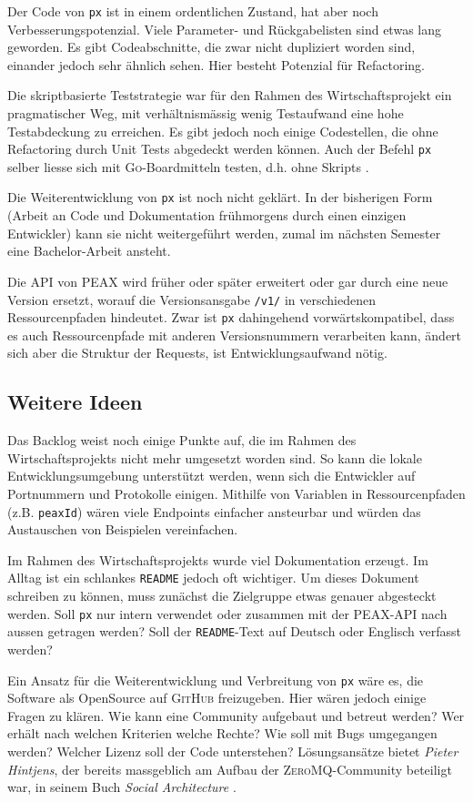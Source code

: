 Der Code von \texttt{px} ist in einem ordentlichen Zustand, hat aber noch Verbesserungspotenzial. Viele Parameter- und Rückgabelisten sind etwas lang geworden. Es gibt Codeabschnitte, die zwar nicht dupliziert worden sind, einander jedoch sehr ähnlich sehen. Hier besteht Potenzial für Refactoring.

Die skriptbasierte Teststrategie war für den Rahmen des Wirtschaftsprojekt ein pragmatischer Weg, mit verhältnismässig wenig Testaufwand eine hohe Testabdeckung zu erreichen. Es gibt jedoch noch einige Codestellen, die ohne Refactoring durch Unit Tests abgedeckt werden können. Auch der Befehl \texttt{px} selber liesse sich mit \textsc{Go}-Boardmitteln testen, d.h. ohne Skripts \cite[S. 308-310]{gopl}.

Die Weiterentwicklung von \texttt{px} ist noch nicht geklärt. In der bisherigen Form (Arbeit an Code und Dokumentation frühmorgens durch einen einzigen Entwickler) kann sie nicht weitergeführt werden, zumal im nächsten Semester eine Bachelor-Arbeit ansteht.

Die API von PEAX wird früher oder später erweitert oder gar durch eine neue Version ersetzt, worauf die Versionsansgabe \texttt{/v1/} in verschiedenen Ressourcenpfaden hindeutet. Zwar ist \texttt{px} dahingehend vorwärtskompatibel, dass es auch Ressourcenpfade mit anderen Versionsnummern verarbeiten kann, ändert sich aber die Struktur der Requests, ist Entwicklungsaufwand nötig.

\subsection{Weitere Ideen}

Das Backlog weist noch einige Punkte auf, die im Rahmen des Wirtschaftsprojekts nicht mehr umgesetzt worden sind. So kann die lokale Entwicklungsumgebung unterstützt werden, wenn sich die Entwickler auf Portnummern und Protokolle einigen. Mithilfe von Variablen in Ressourcenpfaden (z.B. \texttt{peaxId}) wären viele Endpoints einfacher ansteurbar und würden das Austauschen von Beispielen vereinfachen.

Im Rahmen des Wirtschaftsprojekts wurde viel Dokumentation erzeugt. Im Alltag ist ein schlankes \texttt{README} jedoch oft wichtiger. Um dieses Dokument schreiben zu können, muss zunächst die Zielgruppe etwas genauer abgesteckt werden. Soll \texttt{px} nur intern verwendet oder zusammen mit der PEAX-API nach aussen getragen werden? Soll der \texttt{README}-Text auf Deutsch oder Englisch verfasst werden?

Ein Ansatz für die Weiterentwicklung und Verbreitung von \texttt{px} wäre es, die Software als OpenSource auf \textsc{GitHub} freizugeben. Hier wären jedoch einige Fragen zu klären. Wie kann eine Community aufgebaut und betreut werden? Wer erhält nach welchen Kriterien welche Rechte? Wie soll mit Bugs umgegangen werden? Welcher Lizenz soll der Code unterstehen? Lösungsansätze bietet \textit{Pieter Hintjens}, der bereits massgeblich am Aufbau der \textsc{ZeroMQ}-Community beteiligt war, in seinem Buch \textit{Social Architecture} \cite{social-architecture}.
